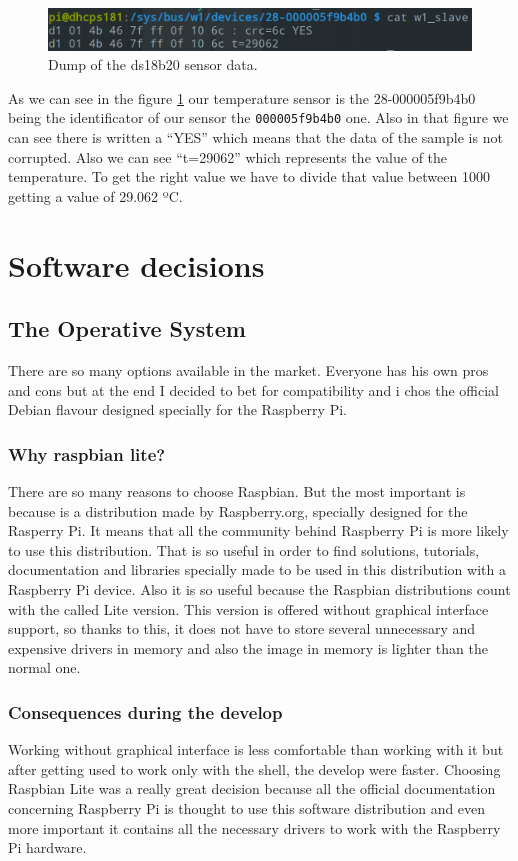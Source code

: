 			\begin{figure}[h!]
			\includegraphics[width=12cm]{fig/ds18b20-dump.png}
			\centering
			\caption{Dump of the ds18b20 sensor data.\label{fig:ds18b20-dump}}
			\end{figure}

			As we can see in the figure \ref{fig:ds18b20-dump} our temperature sensor is the 28-000005f9b4b0 being the identificator of our sensor the \texttt{000005f9b4b0} one. Also in that figure we can see there is written a ``YES'' which means that the data of the sample is not corrupted. Also we can see ``t=29062'' which represents the value of the temperature. To get the right value we have to divide that value between 1000 getting a value of 29.062 ºC.

\chapter{Software decisions}
	\section{The Operative System}
	There are so many options available in the market. Everyone has his own pros and cons but at the end I decided to bet for compatibility and i chos the official Debian flavour designed specially for the Raspberry Pi.
		\subsection{Why raspbian lite?}
		There are so many reasons to choose Raspbian. But the most important is because is a distribution made by Raspberry.org, specially designed for the Rasperry Pi. It means that all the community behind Raspberry Pi is more likely to use this distribution. That is so useful in order to find solutions, tutorials, documentation and libraries specially made to be used in this distribution with a Raspberry Pi device.
		Also it is so useful because the Raspbian distributions count with the called Lite version. This version is offered without graphical interface support, so thanks to this, it does not have to store several unnecessary and expensive drivers in memory and also the image in memory is lighter than the normal one.
		\subsection{Consequences during the develop}
		Working without graphical interface is less comfortable than working with it but after getting used to work only with the shell, the develop were faster. Choosing Raspbian Lite was a really great decision because all the official documentation concerning Raspberry Pi is thought to use this software distribution and even more important it contains all the necessary drivers to work with the Raspberry Pi hardware.

